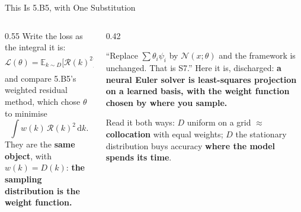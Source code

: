 \begin{frame}{This Is 5.B5, with One Substitution}
\begin{columns}[T]
\begin{column}{0.55\textwidth}
\small
Write the loss as the integral it is:
\[
  \mathcal{L}(\theta)=\mathbb{E}_{k\sim D}\bigl[\mathcal{R}(k)^{2}\bigr]
  =\int \mathcal{R}(k)^{2}\,D(k)\,\mathrm{d}k ,
\]
and compare 5.B5's weighted residual method, which chose $\theta$ to minimise
\[
  \int w(k)\,\mathcal{R}(k)^{2}\,\mathrm{d}k .
\]
They are the \textbf{same object}, with $w(k)=D(k)$: \textbf{the sampling distribution is the weight function.}
\end{column}
\begin{column}{0.42\textwidth}
\begin{takeawaybox}[title=\textbf{The promise 5.B1 made}]\small
``Replace $\sum\theta_i\psi_i$ by $\mathcal{N}(x;\theta)$ and the framework is unchanged. That is S7.''
\medskip
Here it is, discharged: \textbf{a neural Euler solver is least-squares projection on a learned basis, with the weight function chosen by where you sample.}
\end{takeawaybox}
\smallskip
{\footnotesize Read it both ways: $D$ uniform on a grid $\approx$ \textbf{collocation} with equal weights; $D$ the stationary distribution buys accuracy \textbf{where the model spends its time}.}
\end{column}
\end{columns}
\vspace{1mm}
\end{frame}


